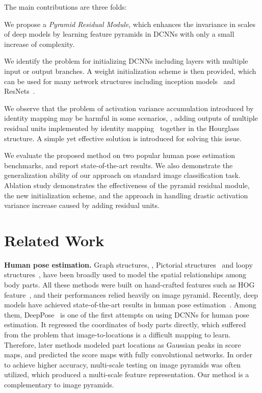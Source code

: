 \documentclass[10pt,twocolumn,letterpaper]{article}
\newcommand{\smalltitle}[1]{\vspace{0.2em}\noindent \textbf{{#1}}}
\newenvironment{myitemize}[1][]{
\begin{list}{{#1}} 
	{
		\setlength{\leftmargin}{1.2em}
		\setlength{\topsep}{0em}
		\setlength{\itemsep}{-0.2em}
}}
{\end{list}}
\begin{document}
The main contributions are three folds:
\begin{myitemize}
	\item[] We propose a \textit{Pyramid Residual Module}, which enhances the invariance in scales of deep models by learning feature pyramids in DCNNs with only a small increase of complexity.
	\item[] We identify the problem for initializing DCNNs including layers with multiple input or output branches. A weight initialization scheme is then provided, which can be used for many network structures including inception models~\cite{szegedy2015going,ioffe2015batch,szegedy2016rethinking,szegedy2016inception} and ResNets~\cite{he2016deep,he2016identity}.
	\item[] We observe that the problem of activation variance accumulation introduced by identity mapping may be harmful in some scenarios, \eg, adding outputs of multiple residual units implemented by identity mapping~\cite{he2016identity} together in the Hourglass structure. A simple yet effective solution is introduced for solving this issue. 
\end{myitemize}
We evaluate the proposed method on two popular human pose estimation benchmarks, and report state-of-the-art results. 
We also demonstrate the generalization ability of our approach on standard image classification task. 
Ablation study demonstrates the effectiveness of the pyramid residual module, the new initialization scheme, and the approach in handling drastic activation variance increase caused by adding residual units.





\section{Related Work}
\smalltitle{Human pose estimation. }
Graph structures, \eg, Pictorial structures~\cite{fischler1973representation,felzenszwalb2005pictorial,yang2011articulated} and loopy structures~\cite{ren2005recovering,tian2010fast,ferrari20092d}, have been broadly used to model the spatial relationships among body parts. 
All these methods were built on hand-crafted features such as HOG feature~\cite{dalal2005histograms}, and their performances relied heavily on image pyramid. 
Recently, deep models have achieved state-of-the-art results in human pose estimation~\cite{belagiannis2016recurrent,insafutdinov2016deepercut,bulat2016human,wei2016convolutional,newell2016stacked,chu2016structure,yang2016end,chu2017multi,cao2017realtime,papandreou2017towards}. 
Among them, DeepPose~\cite{toshev2014deeppose} is one of the first attempts on using DCNNs for human pose estimation. 								 
It regressed the coordinates of body parts directly, which suffered from the problem that image-to-locations is a difficult mapping to learn. 
Therefore, later methods modeled part locations as Gaussian peaks in score maps, and predicted the score maps with fully convolutional networks. 
In order to achieve higher accuracy, multi-scale testing on image pyramids was often utilized, which produced a multi-scale feature representation. 
Our method is a complementary to image pyramids.
\end{document}

